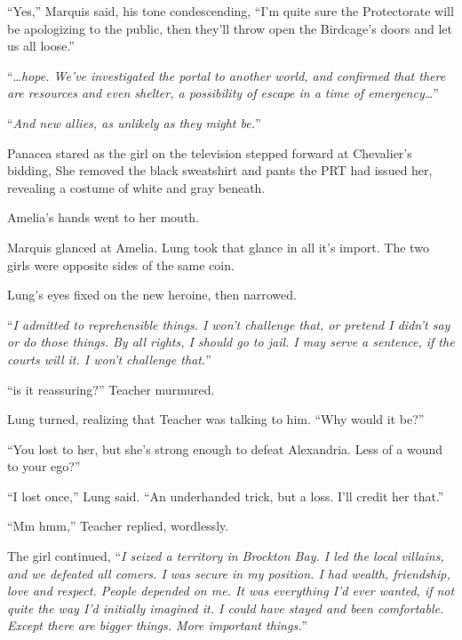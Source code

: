``Yes,'' Marquis said, his tone condescending, ``I'm quite sure the Protectorate will be apologizing to the public, then they'll throw open the Birdcage's doors and let us all loose.''



``\ldots\emph{hope.  We've investigated the portal to another world, and confirmed that there are resources and even shelter, a possibility of escape in a time of emergency\ldots}''



``\emph{And new allies, as unlikely as they might be.}''



Panacea stared as the girl on the television stepped forward at Chevalier's bidding, She removed the black sweatshirt and pants the PRT had issued her, revealing a costume of white and gray beneath.



Amelia's hands went to her mouth.



Marquis glanced at Amelia.  Lung took that glance in all it's import.  The two girls were opposite sides of the same coin.



Lung's eyes fixed on the new heroine, then narrowed.



``\emph{I admitted to reprehensible things.  I won't challenge that, or pretend I didn't say or do those things.  By all rights, I should go to jail.  I may serve a sentence, if the courts will it.  I won't challenge that.}''



``is it reassuring?'' Teacher murmured.



Lung turned, realizing that Teacher was talking to him.  ``Why would it be?''



``You lost to her, but she's strong enough to defeat Alexandria.  Less of a wound to your ego?''



``I lost once,'' Lung said.  ``An underhanded trick, but a loss.  I'll credit her that.''



``Mm hmm,'' Teacher replied, wordlessly.



The girl continued, ``\emph{I seized a territory in Brockton Bay.  I led the local villains, and we defeated all comers.  I was secure in my position.  I had wealth, friendship, love and respect.  People depended on me.  It was everything I'd ever wanted, if not quite the way I'd initially imagined it.  I could have stayed and been comfortable. Except there are bigger things.  More important things.}''



